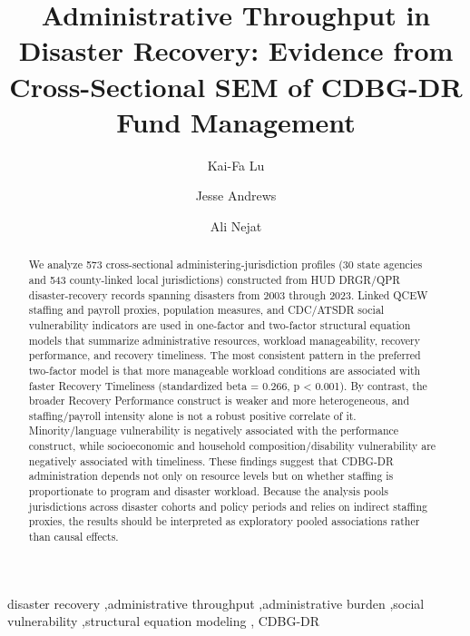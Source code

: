 \documentclass[
  number]{elsarticle}
\begin{document}
\begin{frontmatter}
\title{Administrative Throughput in Disaster Recovery: Evidence from
Cross-Sectional SEM of CDBG-DR Fund Management}
\author[1]{Kai-Fa Lu%
%
}

\author[1]{Jesse Andrews%
%
}

\author[1]{Ali Nejat%
%
}





        
\begin{abstract}
We analyze 573 cross-sectional administering-jurisdiction profiles (30
state agencies and 543 county-linked local jurisdictions) constructed
from HUD DRGR/QPR disaster-recovery records spanning disasters from 2003
through 2023. Linked QCEW staffing and payroll proxies, population
measures, and CDC/ATSDR social vulnerability indicators are used in
one-factor and two-factor structural equation models that summarize
administrative resources, workload manageability, recovery performance,
and recovery timeliness. The most consistent pattern in the preferred
two-factor model is that more manageable workload conditions are
associated with faster Recovery Timeliness (standardized beta = 0.266, p
\textless{} 0.001). By contrast, the broader Recovery Performance
construct is weaker and more heterogeneous, and staffing/payroll
intensity alone is not a robust positive correlate of it.
Minority/language vulnerability is negatively associated with the
performance construct, while socioeconomic and household
composition/disability vulnerability are negatively associated with
timeliness. These findings suggest that CDBG-DR administration depends
not only on resource levels but on whether staffing is proportionate to
program and disaster workload. Because the analysis pools jurisdictions
across disaster cohorts and policy periods and relies on indirect
staffing proxies, the results should be interpreted as exploratory
pooled associations rather than causal effects.
\end{abstract}





\begin{keyword}
    disaster recovery \sep administrative throughput \sep administrative
burden \sep social vulnerability \sep structural equation modeling \sep 
    CDBG-DR
\end{keyword}
\end{frontmatter}
    
\end{document}
